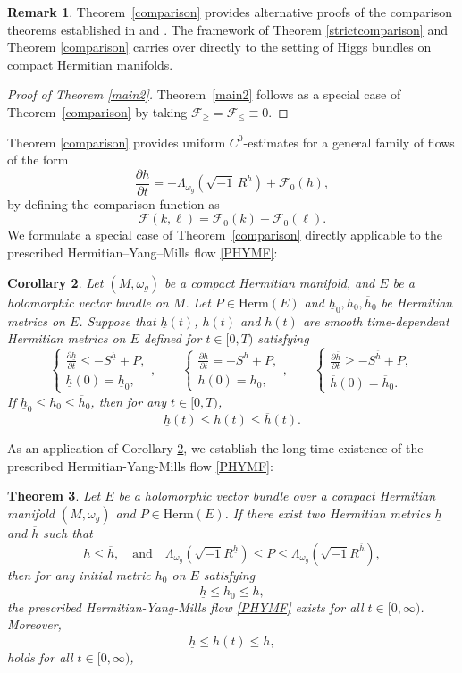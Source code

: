 \documentclass[12pt, reqno]{amsart}
\newcommand\sF{{\mathscr F}}
\theoremstyle{plain}
\newtheorem{thm}{Theorem}[section]
\newtheorem{cor}[thm]{Corollary}
\theoremstyle{definition}
\newtheorem{remark}[thm]{Remark}
\newcommand{\btheorem}{\begin{thm}}
\newcommand{\etheorem}{\end{thm}}
\newcommand{\bcorollary}{\begin{cor}}
\newcommand{\ecorollary}{\end{cor}}
\newcommand{\bproof}{\begin{proof}}
\newcommand{\eproof}{\end{proof}}
\newcommand{\bremark}{\begin{remark}}
\newcommand{\eremark}{\end{remark}}
\newcommand{\sq}{\sqrt{-1}}
\newcommand{\p}{\partial}
\newcommand{\beq}{\begin{equation}}
\newcommand{\eeq}{\end{equation}}
\newcommand{\qtq}[1]{\quad\mbox{#1}\quad}
\renewcommand{\>}{\rightarrow}
\renewcommand{\>}{\rightarrow}
\renewcommand{\p}{{\partial}}
\newcommand{\om}{\omega}
\numberwithin{equation}{section} %
\begin{document}
\bremark Theorem~\ref{comparison} provides alternative proofs of the comparison theorems established in \cite{WYY26+} and \cite{FWYY26+}. The framework of Theorem \ref{strictcomparison} and Theorem \ref{comparison} carries  over directly to the setting of Higgs bundles on compact Hermitian manifolds.
\eremark

\noindent \bproof[Proof of Theorem \ref{main2}] Theorem~\ref{main2} follows as a special case of Theorem~\ref{comparison} by taking $\sF_{\geq} = \sF_{\leq} \equiv 0$.
\eproof


\noindent  Theorem \ref{comparison} provides uniform $C^0$-estimates for a general family of flows of the form \begin{equation}
\frac{\partial h}{\partial t} = -\Lambda_{\omega_g}\left(\sqrt{-1}\, R^h\right) + \mathcal{F}_0(h),
\end{equation}
by  defining the comparison function as
\beq \sF(k,\ell)=\sF_0(k)-\sF_0(\ell). \eeq
We  formulate a special case of Theorem~\ref{comparison} directly applicable to the prescribed Hermitian--Yang--Mills flow \eqref{PHYMF}:

\bcorollary\label{cor comparison} Let $(M,\om_g)$ be a compact Hermitian manifold, and  $E$ be a holomorphic vector bundle on $M$. Let $P\in \mathrm{Herm}(E)$ and $\underline h_0, h_0, \overline h_0$ be Hermitian metrics on $E$. Suppose that  $\underline h(t)$, $h(t)$ and $\overline h(t)$ are smooth time-dependent Hermitian metrics on $E$ defined for $t\in [0,T)$ satisfying
\beq \begin{cases} \frac{\p \underline h}{\p t}\leq -S^{\underline h}+P,\\
    \underline h(0)=\underline h_0,\end{cases},   \qquad  \begin{cases} \frac{\p h}{\p t}=-S^h+P,\\
    h(0)=h_0,\end{cases}, \qquad \begin{cases} \frac{\p \overline h}{\p t}\geq -S^{\overline h }+P,\\
    \overline h(0)=\overline h_0.\end{cases}   \eeq
If $\underline h_0\leq h_0\leq \overline h_0$, then for any $t\in [0, T)$,
\beq \underline h (t) \leq h(t)\leq \overline h(t).\eeq
\ecorollary




\noindent As an application of Corollary  \ref{cor comparison}, we establish the long-time existence of the prescribed Hermitian-Yang-Mills flow \eqref{PHYMF}:
\btheorem\label{thm long time existence}
Let  $E$ be a holomorphic vector bundle over a compact Hermitian manifold
$(M,\omega_g)$ and $P\in \mathrm{Herm}(E)$. If there exist two  Hermitian metrics \(\underline h\) and \(\overline h\) such that
\beq
\underline h\leq  \overline h, \qtq{and}
\Lambda_{\omega_g}\left(\sq R^{\underline h}\right)\leq P\leq \Lambda_{\omega_g}\left(\sq R^{\overline
    h}\right),
\eeq
then for any  initial metric $h_0$ on $E$ satisfying  \beq   \underline h\leq h_0\leq \overline h,\eeq  the
prescribed Hermitian-Yang-Mills flow \eqref{PHYMF}
exists for all $t\in[0,\infty)$. Moreover,
\beq \underline h \leq h(t)\leq \overline h, \label{C0}\eeq
holds for all $t\in[0,\infty)$,
\etheorem
\end{document}
